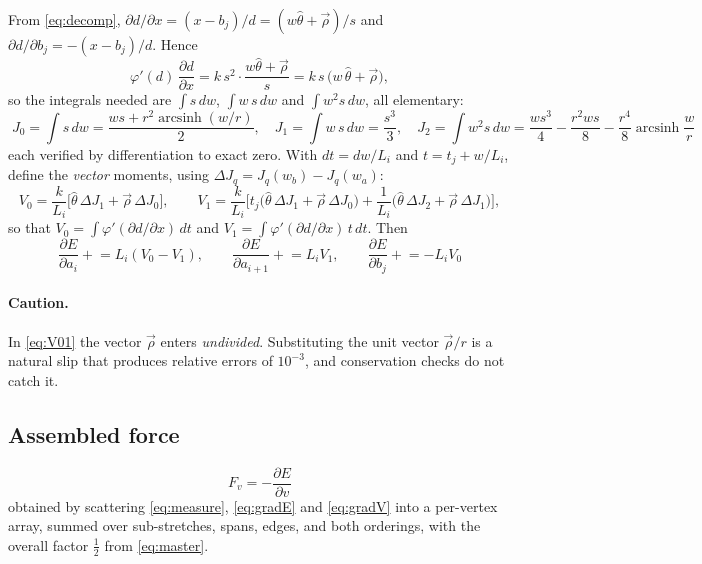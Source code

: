\documentclass[11pt]{article}
\newcommand{\asinh}{\operatorname{arcsinh}}
\newcommand{\that}{\hat\theta}
\newcommand{\rvec}{\vec\rho}
\begin{document}
From \eqref{eq:decomp}, $\partial d/\partial x = (x-b_j)/d = (w\that+\rvec)/s$ and $\partial d/\partial b_j = -(x-b_j)/d$. Hence
\begin{equation}
\varphi'(d)\,\frac{\partial d}{\partial x} = k\,s^2\cdot\frac{w\that+\rvec}{s} = k\,s\,\big(w\,\that + \rvec\big),
\end{equation}
so the integrals needed are $\int s\,dw$, $\int w\,s\,dw$ and $\int w^2s\,dw$, all elementary:
\begin{equation}
\boxed{\;
J_0 = \int\! s\,dw = \frac{ws + r^2\asinh(w/r)}{2}, \quad
J_1 = \int\! w\,s\,dw = \frac{s^3}{3}, \quad
J_2 = \int\! w^2 s\,dw = \frac{ws^3}{4} - \frac{r^2ws}{8} - \frac{r^4}{8}\asinh\frac{w}{r}\;}
\label{eq:Js}
\end{equation}
each verified by differentiation to exact zero. With $dt = dw/L_i$ and $t = t_j + w/L_i$, define the \emph{vector} moments, using $\Delta J_q = J_q(w_b)-J_q(w_a)$:
\begin{equation}
V_0 = \frac{k}{L_i}\Big[\that\,\Delta J_1 + \rvec\,\Delta J_0\Big], \qquad
V_1 = \frac{k}{L_i}\Big[t_j\big(\that\,\Delta J_1 + \rvec\,\Delta J_0\big)
+ \frac{1}{L_i}\big(\that\,\Delta J_2 + \rvec\,\Delta J_1\big)\Big],
\label{eq:V01}
\end{equation}
so that $V_0 = \int\varphi'(\partial d/\partial x)\,dt$ and $V_1 = \int\varphi'(\partial d/\partial x)\,t\,dt$. Then
\begin{equation}
\boxed{\;
\frac{\partial E}{\partial a_i}\mathrel{+}= L_i(V_0-V_1), \qquad
\frac{\partial E}{\partial a_{i+1}}\mathrel{+}= L_i V_1, \qquad
\frac{\partial E}{\partial b_j}\mathrel{+}= -L_i V_0 \;}
\label{eq:gradV}
\end{equation}

\paragraph{Caution.} In \eqref{eq:V01} the vector $\rvec$ enters \emph{undivided}. Substituting the unit vector $\rvec/r$ is a natural slip that produces relative errors of $10^{-3}$, and conservation checks do not catch it.

\subsection{Assembled force}

\begin{equation}
\boxed{\;F_v = -\frac{\partial E}{\partial v}\;}
\end{equation}
obtained by scattering \eqref{eq:measure}, \eqref{eq:gradE} and \eqref{eq:gradV} into a per-vertex array, summed over sub-stretches, spans, edges, and both orderings, with the overall factor $\tfrac12$ from \eqref{eq:master}.
\end{document}
